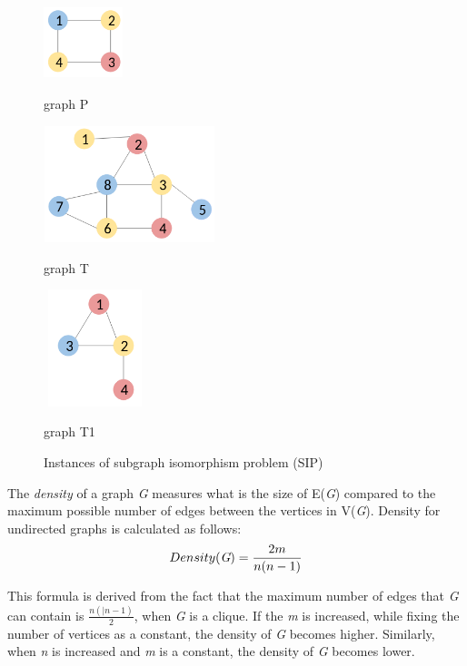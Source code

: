 \documentclass{l4proj}
\newcounter{example}[section]
\begin{document}
\begin{figure}[H]
\centering
\begin{minipage}[t]{.3\textwidth}
  \centering
  \includegraphics[height=2.1cm,width=2.3cm]{images/graphs/exampleGraph2.png}
  \caption{graph P}
  \label{fig:graphP}
\end{minipage}%
\begin{minipage}[t]{.4\textwidth}
  \centering
  \includegraphics[height=3.4cm,width=5cm]{images/graphs/exampleGraph.png}
  \caption{graph T}
  \label{fig:graphT}
\end{minipage}%
\begin{minipage}[t]{.3\textwidth}
  \centering
  \includegraphics[height=3.4cm,width=3cm]{images/graphs/smalltarget.png}
  \caption{graph T1}
  \label{fig:graphT1}
\end{minipage}%
\caption{Instances of subgraph isomorphism problem (SIP)}
\label{fig:SIP}
\end{figure}

The \emph{density} of a graph \emph{G} measures what is the size of E(\emph{G}) compared to the maximum possible number of edges between the vertices in V(\emph{G}). Density for undirected graphs is calculated as follows:
\begin{equation}
\label{eq:graphdensity}
Density (\emph{G}) = \frac{2 \* m}{n(n - 1)}
\end{equation}

This formula is derived from the fact that the maximum number of edges that \emph{G} can contain is $\frac{n(|n - 1)}{2}$, when \emph{G} is a clique. If the \emph{m} is increased, while fixing the number of vertices as a constant, the density of \emph{G} becomes higher. Similarly, when \emph{n} is increased and \emph{m} is a constant, the density of \emph{G} becomes lower.
\end{document}
